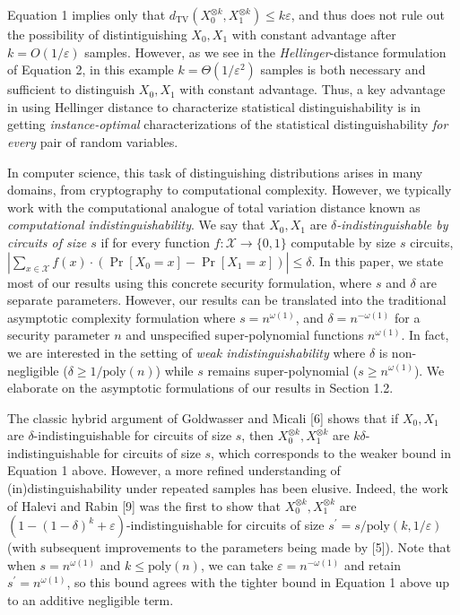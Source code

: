 \documentclass[10pt,a4paper]{article}
\begin{document}
Equation 1 implies only that $d_{\mathrm{TV}}(X_{0}^{\otimes k},X_{1}^{\otimes k})\leq k\varepsilon$, and thus does not rule out the possibility of distintiguishing $X_{0},X_{1}$ with constant advantage after $k=O(1/\varepsilon)$ samples. However, as we see in the \emph{Hellinger}-distance formulation of Equation 2, in this example $k=\Theta(1/\varepsilon^{2})$ samples is both necessary and sufficient to distinguish $X_{0},X_{1}$ with constant advantage. Thus, a key advantage in using Hellinger distance to characterize statistical distinguishability is in getting \emph{instance-optimal} characterizations of the statistical distinguishability \emph{for every} pair of random variables.\par




In computer science, this task of distinguishing distributions arises in many domains, from cryptography to computational complexity. However, we typically work with the computational analogue of total variation distance known as \emph{computational indistinguishability}. We say that $X_{0},X_{1}$ are \emph{$\delta$-indistinguishable by circuits of size $s$} if for every function $f:\mathcal{X}\rightarrow\{0,1\}$ computable by size $s$ circuits, $|\sum_{x\in\mathcal{X}}f(x)\cdot(\Pr[X_{0}=x]-\Pr[X_{1}=x])|\leq\delta$. In this paper, we state most of our results using this concrete security formulation, where $s$ and $\delta$ are separate parameters. However, our results can be translated into the traditional asymptotic complexity formulation where $s=n^{\omega(1)}$, and $\delta=n^{-\omega(1)}$ for a security parameter $n$ and unspecified super-polynomial functions $n^{\omega(1)}$.
In fact, we are interested in the setting of \emph{weak indistinguishability} where $\delta$ is non-negligible ($\delta\geq 1/\mathrm{poly}(n)$) while $s$ remains super-polynomial ($s\geq n^{\omega(1)}$). We elaborate on the asymptotic formulations of our results in Section 1.2.\par




The classic hybrid argument of Goldwasser and Micali [6] shows that if $X_{0},X_{1}$ are $\delta$-indistinguishable for circuits of size $s$, then $X_{0}^{\otimes k},X_{1}^{\otimes k}$ are $k\delta$-indistinguishable for circuits of size $s$, which corresponds to the weaker bound in Equation 1 above. However, a more refined understanding of (in)distinguishability under repeated samples has been elusive. Indeed, the work of Halevi and Rabin [9] was the first to show that $X_{0}^{\otimes k},X_{1}^{\otimes k}$ are $(1-(1-\delta)^{k}+\varepsilon)$-indistinguishable for circuits of size $s^{\prime}=s/\mathrm{poly}(k,1/\varepsilon)$ (with subsequent improvements to the parameters being made by [5]). Note that when $s=n^{\omega(1)}$ and $k\leq\mathrm{poly}(n)$, we can take $\varepsilon=n^{-\omega(1)}$ and retain $s^{\prime}=n^{\omega(1)}$, so this bound agrees with the tighter bound in Equation 1 above up to an additive negligible term.\par
\end{document}
